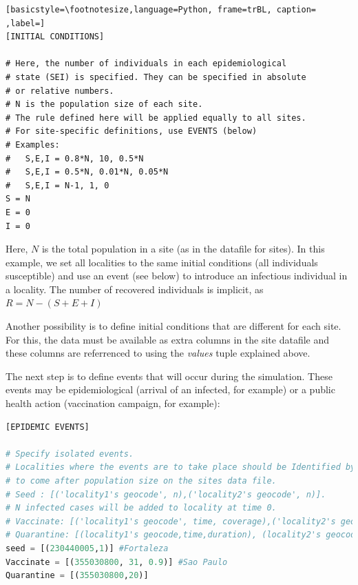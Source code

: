 \begin{lstlisting}[basicstyle=\footnotesize,language=Python, frame=trBL, caption= ,label=]
[INITIAL CONDITIONS]

# Here, the number of individuals in each epidemiological
# state (SEI) is specified. They can be specified in absolute
# or relative numbers.
# N is the population size of each site.
# The rule defined here will be applied equally to all sites.
# For site-specific definitions, use EVENTS (below)
# Examples:
#	S,E,I = 0.8*N, 10, 0.5*N
#	S,E,I = 0.5*N, 0.01*N, 0.05*N
#	S,E,I = N-1, 1, 0
S = N
E = 0
I = 0
\end{lstlisting}

Here, $N$ is the total population in a site (as in the datafile for sites). In this example, we set all localities to the same initial conditions (all individuals susceptible) and use an event (see below) to introduce an infectious individual in a locality. The number of recovered individuals is implicit, as $R = N-(S+E+I)$

Another possibility is to define initial conditions that are different for each site. For this, the data must be available as extra columns in the site datafile and these columns are referrenced to using the \textit{values} tuple explained above.

The next step is to define events that will occur during the simulation. These events may be epidemiological (arrival of an infected, for example) or a public health action (vaccination campaign, for example):

\begin{lstlisting}[basicstyle=\footnotesize,language=Python, frame=trBL, caption=Defining epidemic events ,label=lst:event]
[EPIDEMIC EVENTS]

# Specify isolated events.
# Localities where the events are to take place should be Identified by a numeric code 
# to come after population size on the sites data file.
# Seed : [('locality1's geocode', n),('locality2's geocode', n)]. 
# N infected cases will be added to locality at time 0.
# Vaccinate: [('locality1's geocode', time, coverage),('locality2's geocode', time, coverage)] 
# Quarantine: [(locality1's geocode,time,duration), (locality2's geocode,time,duration)]
seed = [(230440005,1)] #Fortaleza
Vaccinate = [(355030800, 31, 0.9)] #Sao Paulo
Quarantine = [(355030800,20)]
\end{lstlisting}

